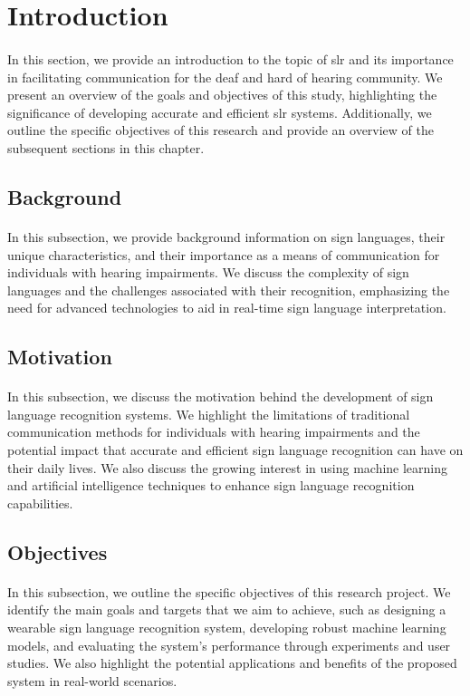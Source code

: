 \section{Introduction}
\paragraph{}
In this section, we provide an introduction to the topic of \ac{slr} and its importance in facilitating communication for the deaf and hard of hearing community. We present an overview of the goals and objectives of this study, highlighting the significance of developing accurate and efficient \ac{slr} systems. Additionally, we outline the specific objectives of this research and provide an overview of the subsequent sections in this chapter.
\subsection{Background}
\paragraph{}
In this subsection, we provide background information on sign languages, their unique characteristics, and their importance as a means of communication for individuals with hearing impairments. We discuss the complexity of sign languages and the challenges associated with their recognition, emphasizing the need for advanced technologies to aid in real-time sign language interpretation.
\subsection{Motivation}
\paragraph{}
In this subsection, we discuss the motivation behind the development of sign language recognition systems. We highlight the limitations of traditional communication methods for individuals with hearing impairments and the potential impact that accurate and efficient sign language recognition can have on their daily lives. We also discuss the growing interest in using machine learning and artificial intelligence techniques to enhance sign language recognition capabilities.
\subsection{Objectives}
\paragraph{}
In this subsection, we outline the specific objectives of this research project. We identify the main goals and targets that we aim to achieve, such as designing a wearable sign language recognition system, developing robust machine learning models, and evaluating the system's performance through experiments and user studies. We also highlight the potential applications and benefits of the proposed system in real-world scenarios.

